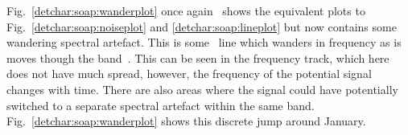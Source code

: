 Fig.~\ref{detchar:soap:wanderplot} once again~ shows the equivalent plots to
Fig.~\ref{detchar:soap:noiseplot} and \ref{detchar:soap:lineplot} but now
contains some~ wandering spectral artefact.  This is
some~ line which wanders in
frequency as is moves though the band~.  This can be seen in the frequency
track, which here does not have much spread, however, the frequency of the
potential signal~ changes with time.  There are also areas where the signal
could have potentially~ switched to a separate spectral artefact within the same
band. Fig.~\ref{detchar:soap:wanderplot} shows this discrete jump around
January.~ 

